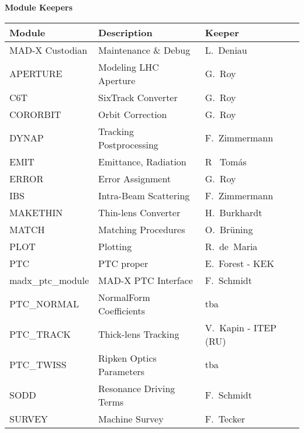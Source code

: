 \begin{center} 
\textbf{\madx Module Keepers} 
\end{center}

%
\begin{table}[H]
  \begin{center}
    \vspace*{1mm}
    \footnotesize
    \begin{tabular}{|l|l|l|}
      \hline
      \textbf{Module}    &\textbf{Description}        &\textbf{Keeper} \\\hline
      MAD-X Custodian    &Maintenance \& Debug        &L.~Deniau \\\hline
      APERTURE           &Modeling LHC Aperture       &G.~Roy \\\hline
      C6T                &SixTrack Converter          &G.~Roy \\\hline
      CORORBIT           &Orbit Correction            &G.~Roy \\\hline
      DYNAP              &Tracking Postprocessing     &F.~Zimmermann \\\hline 
      EMIT               &Emittance, Radiation        &R ~Tom\'as \\\hline  
      ERROR              &Error Assignment            &G.~Roy \\\hline
      IBS                &Intra-Beam Scattering       &F.~Zimmermann \\\hline
      MAKETHIN           &Thin-lens Converter         &H.~Burkhardt \\\hline
      MATCH              &Matching Procedures         &O.~Br\"uning \\\hline
      PLOT               &Plotting                    &R.~de~Maria \\\hline
      PTC                &PTC proper                  &E.~Forest - KEK \\\hline
      madx\_ptc\_module    &MAD-X PTC Interface       &F.~Schmidt \\\hline
      PTC\_NORMAL        &NormalForm Coefficients     &tba \\\hline
      PTC\_TRACK         &Thick-lens Tracking         &V.~Kapin - ITEP (RU) \\\hline
      PTC\_TWISS         &Ripken Optics Parameters    &tba \\\hline
      SODD               &Resonance Driving Terms     &F.~Schmidt \\\hline
      SURVEY             &Machine Survey              &F.~Tecker \\\hline

\end{tabular}
\end{center}
\end{table}
